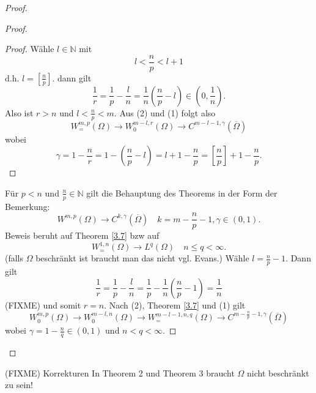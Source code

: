 \documentclass[
paper=a4,
bibtotocnumbered,
liststotocnumbered,
tablecaptionabove,
pointlessnumbers,
twoside,
openright,
10pt
]
{report}
\theoremstyle{definition}
\numberwithin{equation}{chapter}
\begin{document}
\begin{proof}
\begin{enumerate}
\begin{proof}
 		\begin{proof}
			Wähle $l\in \mathbb N$ mit
			\begin{equation}
				l < \frac{n}{p} < l+1
			\end{equation}
			d.h. $l= \left [ \frac{n}{p}\right ]$. dann gilt
			\begin{equation}
			\frac{1}{r} = \frac{1}{p} - \frac{l}{n} = \frac{1}{n} \left ( \frac{n}{p} -l\right ) \in (0, \frac{1}{n}).
			\end{equation}
			Also ist $r>n$ und $l < \frac{n}{p} <m$. Aus (2) und (1) folgt also
			\begin{equation}
				W_=^{m,p}(\Omega) \to W_0^{m-l,r}(\Omega) \to C^{m-l-1, \gamma}(\overline{\Omega})
			\end{equation}
			wobei 
			\begin{equation}
				\gamma = 1-\frac{n}{r} = 1-(\frac{n}{p}-l) = l+1 - \frac{n}{p} = [\frac{n}{p}] + 1 - \frac{n}{p}.
			\end{equation}
 		\end{proof}
 	\item Für $p <n$ und $\frac{n}{p} \in \mathbb N$ gilt die Behauptung des Theorems in der Form der Bemerkung:
 		\begin{equation}
 		W^{m,p}(\Omega) \to C^{k,\gamma}(\overline{\Omega}) \quad k=m-\frac{n}{p} -1, \gamma \in (0,1).
 		\end{equation}
 		Beweis beruht auf Theorem \ref{3.7} bzw auf
 		\begin{equation}
 			W_=^{1,n}(\Omega) \to L^q(\Omega) \quad n \le q <\infty.
 		\end{equation}
 		(falls $\Omega$ beschränkt ist braucht man das nicht vgl. Evans.) Wähle $l=\frac{n}{p}-1$. Dann gilt
		\begin{equation}
			\frac{1}{r} = \frac{1}{p} - \frac{l}{n} = \frac{1}{p} - \frac{1}{n} \left ( \frac{n}{p} -1 \right ) = \frac{1}{n}
		\end{equation} (FIXME)
		und somit $r=n$. Nach (2), Theorem \ref{3.7} und (1) gilt
		\begin{equation}
			W_0^{m,p}(\Omega) \to W_0^{m-l,n}(\Omega)\to W_=^{m-l-1,n,q}(\Omega) \to C^{m-\frac{n}{p}-1, \gamma} (\overline \Omega)
		\end{equation}
		wobei $\gamma = 1- \frac{n}{q} \in (0,1)$ und $n<q<\infty$.
\end{proof}
 \end{enumerate}
 \end{proof}
(FIXME) Korrekturen In Theorem 2 und Theorem 3 braucht $\Omega$ nicht beschränkt zu sein! 
\end{document}
